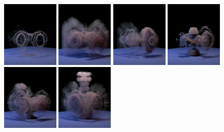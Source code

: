 \documentclass[11pt]{article}
\begin{document}
\begin{figure}
	\centering
	\includegraphics[width=0.24\textwidth]{Figures/modes/plume0000.png}
	\includegraphics[width=0.24\textwidth]{Figures/modes/plume0001.png}	
	\includegraphics[width=0.24\textwidth]{Figures/modes/plume0002.png}
	\includegraphics[width=0.24\textwidth]{Figures/modes/plume0003.png}
	\includegraphics[width=0.24\textwidth]{Figures/modes/plume0004.png}
	\includegraphics[width=0.24\textwidth]{Figures/modes/plume0005.png}

\end{figure}
\end{document}
